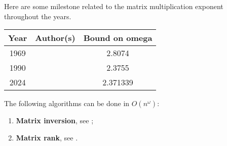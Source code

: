 \noindent
Here are some milestone related to the matrix multiplication exponent throughout the years.
\begin{center}
  \begin{tabular}{|c|c|c|}
    \hline
    Year & Author(s) & Bound on omega \\
    \hline
    1969 & \citet{Strassen1969} & 2.8074 \\ 
    1990 & \citet{COPPERSMITH1990} & 2.3755 \\
    2024 & \citet{2024asymmetryyieldsfastermatrix} & 2.371339 \\
    \hline
  \end{tabular}
\end{center}

\noindent
The following algorithms can be done in \(O(n^\omega)\):
\begin{enumerate}
  \item \textbf{Matrix inversion}, see \citet[Theorem 28.2]{CLRS}; 
  \item \textbf{Matrix rank}, see \cite{IBARRA198245}.
\end{enumerate}

